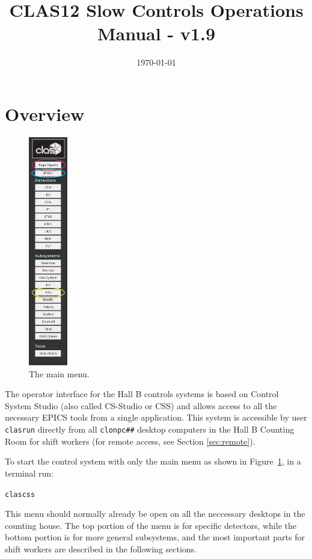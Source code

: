 \documentclass[amsmath,amssymb,notitlepage,11pt]{revtex4}
\begin{document}
\title{CLAS12 Slow Controls Operations Manual - v1.9}
\date{\today}
\begin{abstract}
\end{abstract}

\maketitle
\tableofcontents
\newpage

\section{Overview}

\begin{figure}\centering\vspace{1cm}
  \includegraphics[width=0.15\textwidth]{pics/mainmenu}
  \caption{The main menu.\label{fig:mainmenu}}
\end{figure}

The operator interface for the Hall B controls systems is based on Control System Studio (also called CS-Studio or CSS) and allows access to all the necessary EPICS tools from a single application.  This system is accessible by user \texttt{clasrun} directly from all \texttt{clonpc\#\#} desktop computers in the Hall B Counting Room for shift workers (for remote access, see Section \ref{sec:remote}).


To start the control system with only the main menu as shown in Figure~\ref{fig:mainmenu}, in a terminal run: \begin{center}\texttt{clascss}\end{center}  This menu should normally already be open on all the neccessary desktops in the counting house.  The top portion of the menu is for specific detectors, while the bottom portion is for more general subsystems, and the most important parts for shift workers are described in the following sections.
\end{document}
